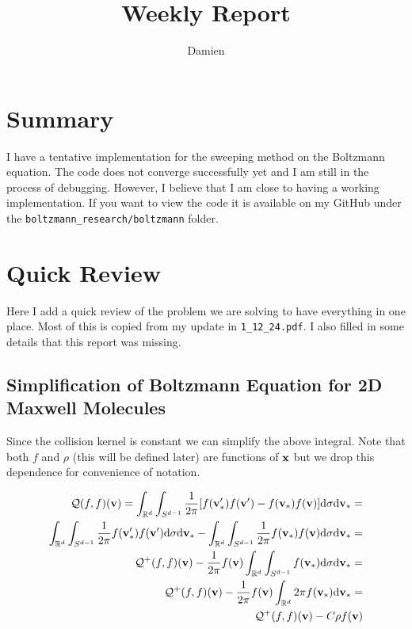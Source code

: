 \documentclass{article}
\title{Weekly Report}
\author{Damien}
\def\t{\text}
\def\b{\textbf}
\begin{document}
\maketitle
\section{Summary}
I have a tentative implementation for the sweeping method on the Boltzmann equation. The code does not converge successfully yet and I am still in the process of debugging. However, I believe that I am close to having a working implementation. If you want to view the code it is available on my GitHub under the \verb|boltzmann_research/boltzmann| folder.
\section{Quick Review}
Here I add a quick review of the problem we are solving to have everything in one place. Most of this is copied from my update in \verb|1_12_24.pdf|. I also filled in some details that this report was missing.
\subsection{Simplification of Boltzmann Equation for 2D Maxwell Molecules}
Since the collision kernel is constant we can simplify the above integral. Note that both $f$ and $\rho$ (this will be defined later) are functions of $\b x$ but we drop this dependence for convenience of notation.
    
\begin{equation} \label{eq:derivation}
    \begin{aligned}
        \mathcal{Q}(f,f)(\b v) = \int_{\mathbb{R}^d} \int_{S^{d-1}} \frac{1}{2\pi}[f(\b v_*') f(\b v') - f(\b v_*) f(\b v)] \t d \sigma \t d \b v_* =\\
        \int_{\mathbb{R}^d} \int_{S^{d-1}} \frac{1}{2\pi}f(\b v_*') f(\b v') \t d \sigma \t d \b v_* - \int_{\mathbb{R}^d} \int_{S^{d-1}} \frac{1}{2\pi} f(\b v_*) f(\b v) \t d \sigma \t d \b v_* = \\
        \mathcal{Q}^+(f,f)(\b v) - \frac{1}{2\pi} f(\b v) \int_{\mathbb{R}^d} \int_{S^{d-1}}  f(\b v_*) \t d \sigma \t d \b v_* =\\ 
        \mathcal{Q}^+(f,f)(\b v) - \frac{1}{2\pi} f(\b v) \int_{\mathbb{R}^d} 2 \pi f(\b v_*) \t d \b v_* =\\
        \mathcal{Q}^+(f,f)(\b v) - C \rho f(\b v)
    \end{aligned}
\end{equation}
\end{document}
